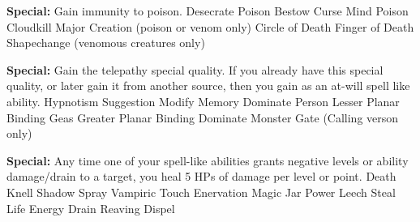 \textbf{Special: }{Gain immunity to poison.}
\sphere
{Desecrate}
{Poison}
{Bestow Curse}
{Mind Poison}
{Cloudkill}
{Major Creation (poison or venom only)}
{Circle of Death}
{Finger of Death}
{Shapechange (venomous creatures only)}

\textbf{Special: }{Gain the telepathy special quality. If you already have this special quality, or later gain it from another source, then you gain  as an at-will spell like ability.}
\sphere
{Hypnotism}
{Suggestion}
{Modify Memory}
{Dominate Person}
{Lesser Planar Binding}
{Geas}
{Greater Planar Binding}
{Dominate Monster}
{Gate (Calling verson only)}

\textbf{Special: }{Any time one of your spell-like abilities grants negative levels or ability damage/drain to a target, you heal 5 HPs of damage per level or point.}
\sphere
{Death Knell}
{Shadow Spray}
{Vampiric Touch}
{Enervation}
{Magic Jar}
{Power Leech}
{Steal Life}
{Energy Drain}
{Reaving Dispel}
